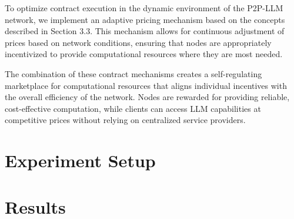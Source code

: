 \documentclass[preprint,twoside,11pt]{article}
\begin{document}
To optimize contract execution in the dynamic environment of the P2P-LLM network, we implement an adaptive pricing mechanism based on the concepts described in Section 3.3. This mechanism allows for continuous adjustment of prices based on network conditions, ensuring that nodes are appropriately incentivized to provide computational resources where they are most needed.

The combination of these contract mechanisms creates a self-regulating marketplace for computational resources that aligns individual incentives with the overall efficiency of the network. Nodes are rewarded for providing reliable, cost-effective computation, while clients can access LLM capabilities at competitive prices without relying on centralized service providers.

\section{Experiment Setup}

\section{Results}

%
\newpage

\appendix
\end{document}
